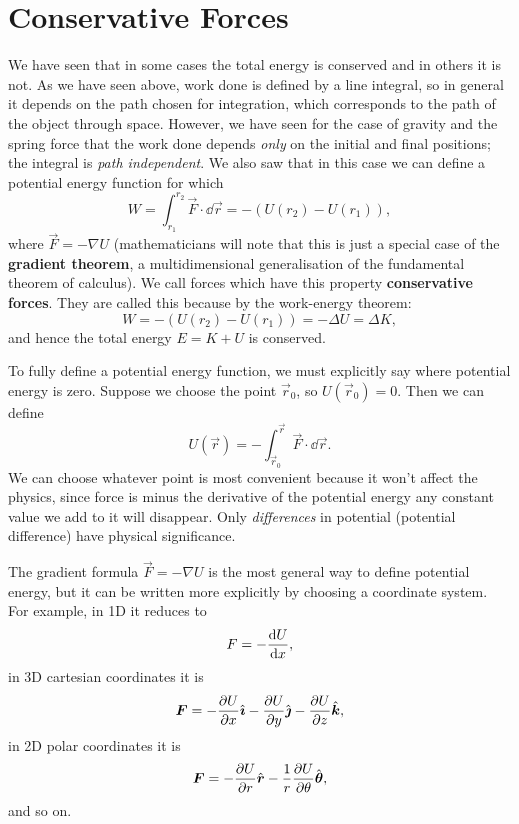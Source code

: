 \documentclass[../classical_mechanics.tex]{subfiles}
\begin{document}
    \section{Conservative Forces}\label{sec:conservative-forces}
        We have seen that in some cases the total energy is conserved and in others it is not.
        As we have seen above, work done is defined by a line integral, so in general it depends on the path chosen for integration, which corresponds to the path of the object through space.
        However, we have seen for the case of gravity and the spring force that the work done depends \textit{only} on the initial and final positions; the integral is \textit{path independent}.
        We also saw that in this case we can define a potential energy function for which
        \begin{equation}
            W=\int_{r_1}^{r_2}\vec{F}\cdot\dd{\vec{r}}=-(U(r_2)-U(r_1)),
        \end{equation}
        where $\vec{F}=-\nabla U$ (mathematicians will note that this is just a special case of the \textbf{gradient theorem}, a multidimensional generalisation of the fundamental theorem of calculus).
        We call forces which have this property \textbf{conservative forces}.
        They are called this because by the work-energy theorem:
        \begin{equation}
            W=-(U(r_2)-U(r_1))=-\Delta U=\Delta K,
        \end{equation}
        and hence the total energy $E=K+U$ is conserved.

        To fully define a potential energy function, we must explicitly say where potential energy is zero.
        Suppose we choose the point $\vec{r}_0$, so $U(\vec{r}_0)=0$.
        Then we can define
        \begin{equation}
            U(\vec{r})=-\int_{\vec{r}_0}^{\vec{r}}\vec{F}\cdot\dd{\vec{r}}.
        \end{equation}
        We can choose whatever point is most convenient because it won't affect the physics, since force is minus the derivative of the potential energy any constant value we add to it will disappear.
        Only \textit{differences} in potential (potential difference) have physical significance.

        The gradient formula $\vec{F}=-\nabla U$ is the most general way to define potential energy, but it can be written more explicitly by choosing a coordinate system.
        For example, in 1D it reduces to
        \begin{equation}
            F=-\dv{U}{x},
        \end{equation}
        in 3D cartesian coordinates it is
        \begin{equation}
            \vec{F}=-\pdv{U}{x}\ihat-\pdv{U}{y}\jhat-\pdv{U}{z}\khat,
        \end{equation}
        in 2D polar coordinates it is
        \begin{equation}
            \vec{F}=-\pdv{U}{r}\uvec{r}-\frac{1}{r}\pdv{U}{\theta}\uvec{\theta},
        \end{equation}
        and so on.
\end{document}
